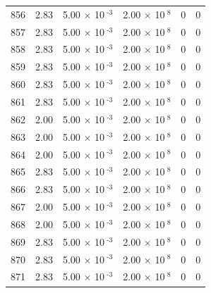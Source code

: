\documentclass[a4paper,11pt]{article}
\begin{document}
\begin{center}
\begin{longtable}{|R{1.5cm}|R{2.4cm}|R{2.4cm}|R{2.4cm}|R{2.4cm}|R{2.4cm}|}
  856 &   2.83  &         5.00 $\times$ 10$^{\text{          -3}}$  &         2.00 $\times$ 10$^{\text{           8}}$  & 0  & 0 \\
  857 &   2.83  &         5.00 $\times$ 10$^{\text{          -3}}$  &         2.00 $\times$ 10$^{\text{           8}}$  & 0  & 0 \\
  858 &   2.83  &         5.00 $\times$ 10$^{\text{          -3}}$  &         2.00 $\times$ 10$^{\text{           8}}$  & 0  & 0 \\
  859 &   2.83  &         5.00 $\times$ 10$^{\text{          -3}}$  &         2.00 $\times$ 10$^{\text{           8}}$  & 0  & 0 \\
  860 &   2.83  &         5.00 $\times$ 10$^{\text{          -3}}$  &         2.00 $\times$ 10$^{\text{           8}}$  & 0  & 0 \\
  861 &   2.83  &         5.00 $\times$ 10$^{\text{          -3}}$  &         2.00 $\times$ 10$^{\text{           8}}$  & 0  & 0 \\
  862 &   2.00  &         5.00 $\times$ 10$^{\text{          -3}}$  &         2.00 $\times$ 10$^{\text{           8}}$  & 0  & 0 \\
  863 &   2.00  &         5.00 $\times$ 10$^{\text{          -3}}$  &         2.00 $\times$ 10$^{\text{           8}}$  & 0  & 0 \\
  864 &   2.00  &         5.00 $\times$ 10$^{\text{          -3}}$  &         2.00 $\times$ 10$^{\text{           8}}$  & 0  & 0 \\
  865 &   2.83  &         5.00 $\times$ 10$^{\text{          -3}}$  &         2.00 $\times$ 10$^{\text{           8}}$  & 0  & 0 \\
  866 &   2.83  &         5.00 $\times$ 10$^{\text{          -3}}$  &         2.00 $\times$ 10$^{\text{           8}}$  & 0  & 0 \\
  867 &   2.00  &         5.00 $\times$ 10$^{\text{          -3}}$  &         2.00 $\times$ 10$^{\text{           8}}$  & 0  & 0 \\
  868 &   2.00  &         5.00 $\times$ 10$^{\text{          -3}}$  &         2.00 $\times$ 10$^{\text{           8}}$  & 0  & 0 \\
  869 &   2.83  &         5.00 $\times$ 10$^{\text{          -3}}$  &         2.00 $\times$ 10$^{\text{           8}}$  & 0  & 0 \\
  870 &   2.83  &         5.00 $\times$ 10$^{\text{          -3}}$  &         2.00 $\times$ 10$^{\text{           8}}$  & 0  & 0 \\
  871 &   2.83  &         5.00 $\times$ 10$^{\text{          -3}}$  &         2.00 $\times$ 10$^{\text{           8}}$  & 0  & 0 \\

\end{longtable}
\end{center}
\end{document}
